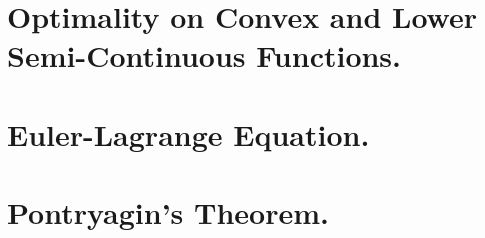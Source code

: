\section{Optimality on Convex and Lower Semi-Continuous Functions.}
\section{Euler-Lagrange Equation.}
\section{Pontryagin's Theorem.}